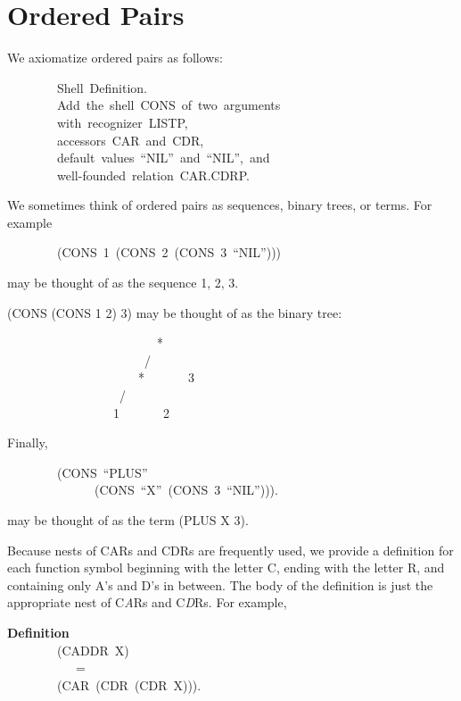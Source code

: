 \documentclass[10pt]{book}
\newenvironment{pubasis}{\begin{flushleft}}{\end{flushleft}}
\newcommand{\axiomordefinition}[1]{\vspace{6pt}\Large\textsf{\textbf{#1}}\normalsize}
\begin{document}
\section{Ordered Pairs}
We axiomatize ordered pairs as follows:

\hrulefill 

\begin{pubasis}
~~~~~~~~Shell~Definition.\\
~~~~~~~~Add~the~shell~CONS~of~two~arguments\\
~~~~~~~~with~recognizer~LISTP,\\
~~~~~~~~accessors~CAR~and~CDR,\\
~~~~~~~~default~values~``NIL''~and~``NIL'',~and\\
~~~~~~~~well-founded~relation~CAR.CDRP.\\
\end{pubasis}

\hrulefill 

We sometimes think of ordered pairs as sequences, binary trees, or terms.
For example
\begin{pubasis}
~~~~~~~~(CONS~1~(CONS~2~(CONS~3~``NIL'')))\\
\end{pubasis}
may be thought of as the sequence 1, 2, 3.

(CONS (CONS 1 2) 3) may be thought of as the binary tree:
\begin{pubasis}
~~~~~~~~~~~~~~~~~~~~~~~~*\\
~~~~~~~~~~~~~~~~~~~~~~/~~~\\\
~~~~~~~~~~~~~~~~~~~~*~~~~~~~3\\
~~~~~~~~~~~~~~~~~~/~~~\\\
~~~~~~~~~~~~~~~~1~~~~~~~2\\
\end{pubasis}
Finally,
\begin{pubasis}
~~~~~~~~(CONS~``PLUS''\\
~~~~~~~~~~~~~~(CONS~``X''~(CONS~3~``NIL''))).\\
\end{pubasis}
may be thought of as the term (PLUS X 3).

\hrulefill 

Because nests of CARs and CDRs are frequently used, we provide a definition
for each function symbol beginning with the letter C, ending with the letter
R, and containing only A's and D's in between.  The body of the definition
is just the appropriate nest of  C\emph{A}Rs and C\emph{D}Rs.  For example,
\begin{pubasis}
\axiomordefinition{Definition}\\
~~~~~~~~(CADDR~X)\\
~~~~~~~~~~~=\\
~~~~~~~~(CAR~(CDR~(CDR~X))).\\
\end{pubasis}
\end{document}
